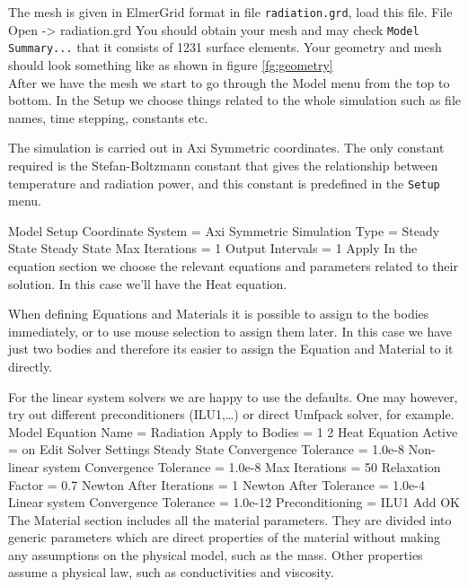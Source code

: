The mesh is given in ElmerGrid format in file \texttt{radiation.grd}, load this file.
\ttbegin
File 
  Open -> radiation.grd
\ttend
You should obtain your mesh and may check \texttt{Model Summary...} that 
it consists of 1231 surface elements.  Your geometry and mesh should look something
like as shown in figure \ref{fg:geometry}\\


After we have the mesh we start to go through the Model menu from the top to bottom. 
In the Setup we choose things related to the whole simulation such as file names, 
time stepping, constants etc.  

The simulation is carried out in Axi Symmetric coordinates. The only constant 
required is the Stefan-Boltzmann constant that gives the
relationship between temperature and radiation power, and this
constant is predefined in the \texttt{Setup} menu.

\ttbegin
Model
  Setup 
     Coordinate System = Axi Symmetric
     Simulation Type = Steady State
     Steady State Max Iterations = 1
     Output Intervals = 1
  Apply
\ttend
In the equation section we choose the relevant equations and parameters related to their solution. 
In this case we'll have the Heat equation.

When defining Equations and Materials it is possible to assign to the bodies 
immediately, or to use mouse selection to assign them later. In this case we 
have just two bodies and therefore its easier to assign the Equation and 
Material to it directly.

For the linear system solvers we are happy to use the defaults. One may however, try out different
preconditioners (ILU1,\ldots) or direct Umfpack solver, for example.
\ttbegin
Model
  Equation
   Name = Radiation
    Apply to Bodies = 1 2
    Heat Equation
      Active = on
    Edit Solver Settings
       Steady State
         Convergence Tolerance = 1.0e-8
       Non-linear system
        Convergence Tolerance = 1.0e-8
        Max Iterations = 50
        Relaxation Factor = 0.7
        Newton After Iterations = 1
        Newton After Tolerance = 1.0e-4
      Linear system
        Convergence Tolerance = 1.0e-12
        Preconditioning = ILU1
    Add 
    OK
\ttend        
The Material section includes all the material parameters. They are divided into 
generic parameters which are direct properties of the material without making 
any assumptions on the physical model, such as the mass. Other properties 
assume a physical law, such as conductivities and viscosity. 

